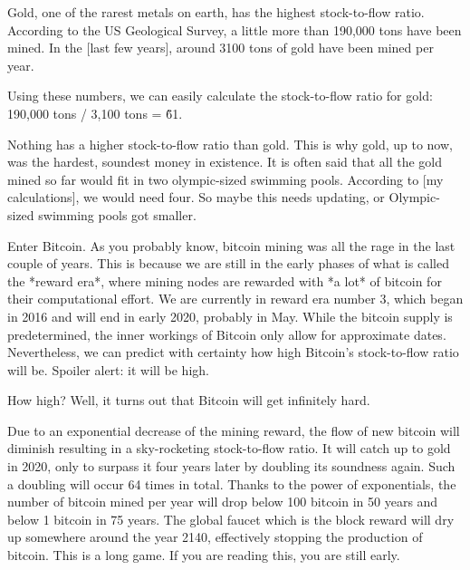 Gold, one of the rarest metals on earth, has the highest stock-to-flow
ratio. According to the US Geological Survey, a little more than 190,000
tons have been mined. In the [last few years], around 3100 tons of gold
have been mined per year.

Using these numbers, we can easily calculate the stock-to-flow ratio for
gold: 190,000 tons / 3,100 tons = \~61.

Nothing has a higher stock-to-flow ratio than gold. This is why gold, up
to now, was the hardest, soundest money in existence. It is often said
that all the gold mined so far would fit in two olympic-sized swimming
pools. According to [my calculations], we would need four. So maybe this
needs updating, or Olympic-sized swimming pools got smaller.

Enter Bitcoin. As you probably know, bitcoin mining was all the rage in
the last couple of years. This is because we are still in the early
phases of what is called the *reward era*, where mining nodes are
rewarded with *a lot* of bitcoin for their computational effort. We are
currently in reward era number 3, which began in 2016 and will end in
early 2020, probably in May. While the bitcoin supply is predetermined,
the inner workings of Bitcoin only allow for approximate dates.
Nevertheless, we can predict with certainty how high Bitcoin's
stock-to-flow ratio will be. Spoiler alert: it will be high.

How high? Well, it turns out that Bitcoin will get infinitely hard.




Due to an exponential decrease of the mining reward, the flow of new
bitcoin will diminish resulting in a sky-rocketing stock-to-flow ratio.
It will catch up to gold in 2020, only to surpass it four years later by
doubling its soundness again. Such a doubling will occur 64 times in
total. Thanks to the power of exponentials, the number of bitcoin mined
per year will drop below 100 bitcoin in 50 years and below 1 bitcoin in
75 years. The global faucet which is the block reward will dry up
somewhere around the year 2140, effectively stopping the production of
bitcoin. This is a long game. If you are reading this, you are still
early.



